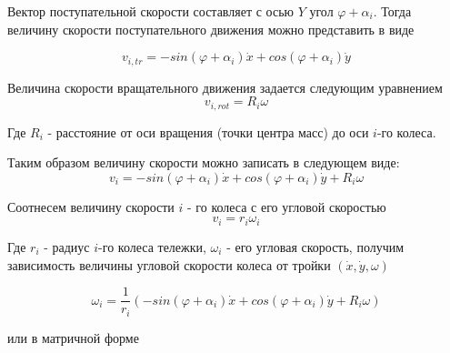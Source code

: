 \documentclass[oneside,final,14pt]{extreport}
\begin{document}
Вектор поступательной скорости составляет с осью $Y$  угол $\varphi + \alpha_{i}$. Тогда величину скорости поступательного движения можно представить в виде

\begin{equation}
v_{i,tr} 
=
-sin(\varphi +\alpha_{i})\dot{x}
+cos(\varphi +\alpha_{i})\dot{y}
\end{equation} 



Величина скорости вращательного движения задается следующим уравнением
\begin{equation}
v_{i,rot}
=
R_{i}\omega
\end{equation}

Где $R_{i}$ - расстояние от оси вращения  (точки центра масс) до оси $i$-го колеса.
\iffalse
 Кроме того, справедливо 
\begin{gather}
\dot{x}
=
v_{x}\boldsymbol{x}
\\
\dot{y}
=
v_{y}\boldsymbol{y}
\\
\dot{\varphi}
=
\omega\boldsymbol{z}
\end{gather}
Где  $v_{x}$, $v_{x}$, $\omega$ - величина скорости по направлению $\boldsymbol{x}$ и $\boldsymbol{y}$ соответственно, $\omega$ - величина угловой скорости.
\fi 
Таким образом величину скорости можно записать в следующем виде:
\begin{equation}
v_{i}
=
-sin(\varphi +\alpha_{i})\dot{x}
+cos(\varphi +\alpha_{i})\dot{y}
+
R_{i}\omega
\end{equation}

Соотнесем величину скорости $i$ - го колеса с его угловой скоростью
\begin{equation}
v_{i}
=
r_{i}\omega_{i}
\end{equation}

Где $r_{i}$  - радиус $i$-го колеса тележки, $\omega_{i}$ - его угловая скорость, получим зависимость величины угловой скорости колеса от тройки  $(\dot{x},\dot{y},\omega)$

\begin{equation}
\omega_{i}
=
\frac{1}{r_{i}}
(
-sin(\varphi +\alpha_{i})\dot{x}
+cos(\varphi +\alpha_{i})\dot{y}
+
R_{i}\omega
)
\end{equation}

или в матричной форме 
\end{document}
